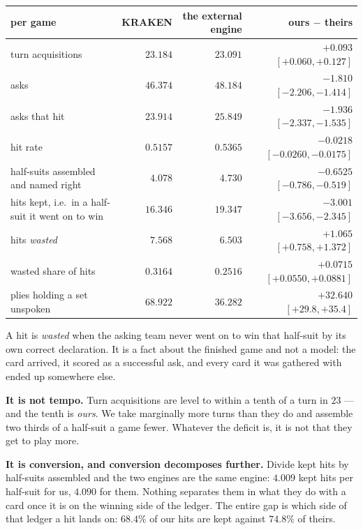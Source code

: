 \documentclass[11pt,letterpaper]{article}
\begin{document}
\begin{center}
\small
\begin{tabular}{>{\raggedright\arraybackslash}p{4.6cm}rrr}
\toprule
per game & KRAKEN & the external engine & ours $-$ theirs \\
\midrule
turn acquisitions & $23.184$ & $23.091$ & $+0.093$ $[+0.060, +0.127]$ \\
asks & $46.374$ & $48.184$ & $-1.810$ $[-2.206, -1.414]$ \\
asks that hit & $23.914$ & $25.849$ & $-1.936$ $[-2.337, -1.535]$ \\
hit rate & $0.5157$ & $0.5365$ & $-0.0218$ $[-0.0260, -0.0175]$ \\
half-suits assembled and named right & $4.078$ & $4.730$ &
$\mathbf{-0.6525}$ $[-0.786, -0.519]$ \\
hits kept, i.e.\ in a half-suit it went on to win & $16.346$ & $19.347$ &
$-3.001$ $[-3.656, -2.345]$ \\
hits \emph{wasted} & $7.568$ & $6.503$ & $\mathbf{+1.065}$ $[+0.758, +1.372]$ \\
wasted share of hits & $0.3164$ & $0.2516$ & $+0.0715$ $[+0.0550, +0.0881]$ \\
plies holding a set unspoken & $68.922$ & $36.282$ & $+32.640$ $[+29.8, +35.4]$ \\
\bottomrule
\end{tabular}
\end{center}

\noindent A hit is \emph{wasted} when the asking team never went on to win
that half-suit by its own correct declaration. It is a fact about the
finished game and not a model: the card arrived, it scored as a successful
ask, and every card it was gathered with ended up somewhere else.

\textbf{It is not tempo.} Turn acquisitions are level to within a tenth of a
turn in $23$ --- and the tenth is \emph{ours}. We take marginally more turns
than they do and assemble two thirds of a half-suit a game fewer. Whatever
the deficit is, it is not that they get to play more.

\textbf{It is conversion, and conversion decomposes further.} Divide kept
hits by half-suits assembled and the two engines are the same engine:
$4.009$ kept hits per half-suit for us, $4.090$ for them. Nothing separates
them in what they do with a card once it is on the winning side of the
ledger. The entire gap is which side of that ledger a hit lands on:
$68.4\%$ of our hits are kept against $74.8\%$ of theirs.
\end{document}
